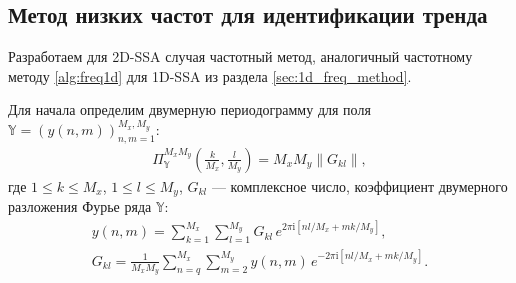 \documentclass[specialist,
               substylefile = spbu.rtx,
               subf,href,colorlinks=true, 12pt]{disser}
\newcommand{\I}{\mathrm{i}}
\begin{document}
%
%
%


\subsection{Метод низких частот для идентификации тренда}
\label{sec:freq_method_2d}

Разработаем для 2D-SSA случая частотный метод, аналогичный частотному методу \ref{alg:freq1d} для 1D-SSA из раздела \ref{sec:1d_freq_method}.

Для начала определим двумерную периодограмму для поля $\mathbb{Y}=\left(y(n,m)\right)_{n,m=1}^{M_x, M_y}$:
\begin{gather*}
 \Pi_\mathbb{Y}^{M_x M_y} \left(\frac{k}{M_x}, \frac{l}{M_y}\right) = M_x M_y \|G_{kl}\|,
\end{gather*}
где $1 \leqslant k \leqslant M_x$, $1 \leqslant l \leqslant M_y$, $G_{kl}$ --- комплексное число, коэффициент двумерного разложения Фурье ряда $\mathbb{Y}$:
\begin{gather*}
y(n,m)=\sum_{k=1}^{M_x}\sum_{l=1}^{M_y} G_{kl}\, e^{2\pi\I \left[nl/M_x + mk/M_y\right]}, \\
 G_{kl}= \frac{1}{M_x M_y} \sum_{n=q}^{M_x}\sum_{m=2}^{M_y} y(n,m)\, e^{-2\pi\I \left[nl/M_x + mk/M_y\right]}.
\end{gather*}
\end{document}
